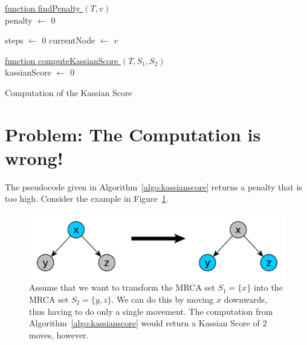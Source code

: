 \documentclass{llncs}
\begin{document}
\begin{algorithm}


\underline{function findPenalty $(T, v)$}\\
penalty $\gets$ $0$\;

steps $\gets$ $0$\;
currentNode $\gets$ $v$\;
\;


\underline{function computeKassianScore $(T, S_1, S_2)$}\\

kassianScore $\gets$ $0$\;




\caption{Computation of the Kassian Score}
\label{algo:kassianscore}
\end{algorithm}

\section{Problem: The Computation is wrong!}
The pseudocode given in Algorithm~\ref{algo:kassianscore} returns a penalty that is too high. Consider the example in Figure~\ref{fig:problem}.

\begin{figure}[H!]
\centering
\includegraphics[scale=0.5]{images/problem_with_kassian_score.pdf}
\caption{Assume that we want to transform the MRCA set $S_1 = \{x\}$ into the MRCA set $S_2 = \{y,z\}$. We can do this by moving $x$ downwards, thus having to do only a single movement. The computation from Algorithm~\ref{algo:kassianscore} would return a Kassian Score of $2$ moves, however.}
\label{fig:problem}
\end{figure}



\end{document}
